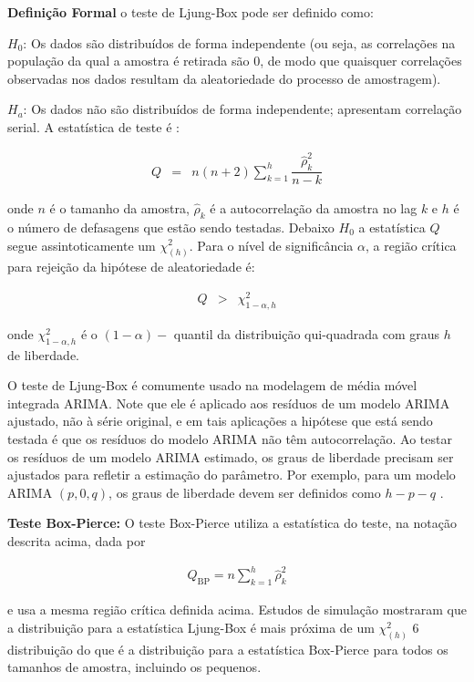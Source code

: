  
 \noindent\textbf{Defini\c c\~ao Formal}
 o teste de Ljung-Box pode ser definido como:
 
 $H_0$: Os dados são distribuídos de forma independente (ou seja, as correlações na população da qual a amostra é retirada são 0, de modo que quaisquer correlações observadas nos dados resultam da aleatoriedade do processo de amostragem).
 
 $H_a$: Os dados não são distribuídos de forma independente; apresentam correlação serial.
 A estatística de teste é \cite{ljung}:
 
 \begin{eqnarray}
 	Q&=&n(n+2) \sum_{k=1}^h \dfrac{\hat{\rho}_k^2}{n-k}
 \end{eqnarray}
 
 \noindent onde $n$ é o tamanho da amostra, $\hat{\rho}_k$ é a autocorrelação da amostra no lag $k$ e $h$ é o número de defasagens que estão sendo testadas. Debaixo $H_0$ a estatística $Q$ segue assintoticamente um $\chi_{(h)}^2$. Para o nível de significância $\alpha$, a região crítica para rejeição da hipótese de aleatoriedade é:
 
 
 \begin{eqnarray}
 	Q&>&\chi_{1-\alpha, h}^2
 \end{eqnarray}
 
 \noindent onde $\chi_{1-\alpha, h}^2$ é o $(1-\alpha)-$ quantil \cite{Brockwell2002} da distribuição qui-quadrada com graus $h$ de liberdade.
 
 O teste de Ljung-Box é comumente usado na modelagem de média móvel integrada ARIMA. Note que ele é aplicado aos resíduos de um modelo ARIMA ajustado, não à série original, e em tais aplicações a hipótese que está sendo testada é que os resíduos do modelo ARIMA não têm autocorrelação. Ao testar os resíduos de um modelo ARIMA estimado, os graus de liberdade precisam ser ajustados para refletir a estimação do parâmetro. Por exemplo, para um modelo ARIMA $(p,0,q)$, os graus de liberdade devem ser definidos como $h-p-q$ \cite{Davidson2000}.
 
 \noindent\textbf{Teste Box-Pierce: }
 O teste Box-Pierce utiliza a estatística do teste, na notação descrita acima, dada por \cite{box}
 
 \begin{eqnarray}
 	Q_{\mathrm{BP}}=n \sum_{k=1}^h \hat{\rho}_k^2
 \end{eqnarray}
 
 \noindent e usa a mesma região crítica definida acima.
 Estudos de simulação mostraram que a distribuição para a estatística Ljung-Box é mais próxima de um $\chi^2_{(h)}$ 6 distribuição do que é a distribuição para a estatística Box-Pierce para todos os tamanhos de amostra, incluindo os pequenos.
 
